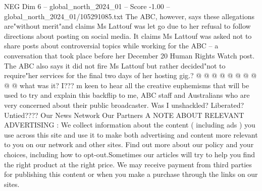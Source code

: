 \begin{textsample}{NEG Dim 6 – global\_north\_2024\_01 – Score -1.00 – global\_north\_2024\_01/105291085.txt}
The ABC, however, says these allegations are"without merit"and claims Ms Lattouf was let go due to her refusal to follow directions about posting on social media.
It claims Ms Lattouf was asked not to share posts about controversial topics while working for the ABC -- a conversation that took place before her December 20 Human Rights Watch post.
The ABC also says it did not fire Ms Lattouf but rather decided"not to require"her services for the final two days of her hosting gig.? @ @ @ @ @ @ @ @ @ @ what was it?
I??? m keen to hear all the creative euphemisms that will be used to try and explain this backflip to me, ABC staff and Australians who are very concerned about their public broadcaster.
Was I unshackled?
Liberated?
Untied????
Our News Network Our Partners A NOTE ABOUT RELEVANT ADVERTISING : We collect information about the content ( including ads ) you use across this site and use it to make both advertising and content more relevant to you on our network and other sites.
Find out more about our policy and your choices, including how to opt-out.Sometimes our articles will try to help you find the right product at the right price.
We may receive payment from third parties for publishing this content or when you make a purchase through the links on our sites.

\end{textsample}
